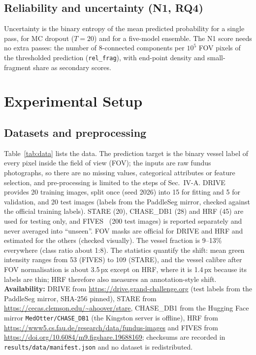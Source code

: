 \documentclass[conference]{IEEEtran}
\begin{document}
\subsection{Reliability and uncertainty (N1, RQ4)}
Uncertainty is the binary entropy of the mean predicted probability for a single pass, for MC dropout ($T{=}20$) and for a five-model ensemble. The N1 score needs no extra passes: the number of 8-connected components per $10^5$ FOV pixels of the thresholded prediction (\texttt{rel\_frag}), with end-point density and small-fragment share as secondary scores.

\section{Experimental Setup}\label{sec:setup}
\subsection{Datasets and preprocessing}
Table~\ref{tab:data} lists the data. The prediction target is the binary vessel label of every pixel inside the field of view (FOV); the inputs are raw fundus photographs, so there are no missing values, categorical attributes or feature selection, and pre-processing is limited to the steps of Sec.~IV-A. DRIVE provides 20 training images, split once (seed 2026) into 15 for fitting and 5 for validation, and 20 test images (labels from the PaddleSeg mirror, checked against the official training labels). STARE (20), CHASE\_DB1 (28) and HRF (45) are used for testing only, and FIVES~\cite{jin2022fives} (200 test images) is reported separately and never averaged into ``unseen''. FOV masks are official for DRIVE and HRF and estimated for the others (checked visually). The vessel fraction is 9--13\% everywhere (class ratio about 1:8). The statistics quantify the shift: mean green intensity ranges from 53 (FIVES) to 109 (STARE), and the vessel calibre after FOV normalisation is about 3.5\,px except on HRF, where it is 1.4\,px because its labels are thin; HRF therefore also measures an annotation-style shift. \textbf{Availability:} DRIVE from \url{https://drive.grand-challenge.org} (test labels from the PaddleSeg mirror, SHA-256 pinned), STARE from \url{https://cecas.clemson.edu/~ahoover/stare}, CHASE\_DB1 from the Hugging Face mirror \texttt{MedOtter/CHASE\_DB1} (the Kingston server is offline), HRF from \url{https://www5.cs.fau.de/research/data/fundus-images} and FIVES from \url{https://doi.org/10.6084/m9.figshare.19688169}; checksums are recorded in \texttt{results/data/manifest.json} and no dataset is redistributed.
\end{document}
